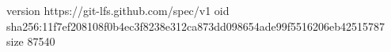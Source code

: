 version https://git-lfs.github.com/spec/v1
oid sha256:11f7ef208108f0b4ec3f8238e312ca873dd098654ade99f5516206eb42515787
size 87540
